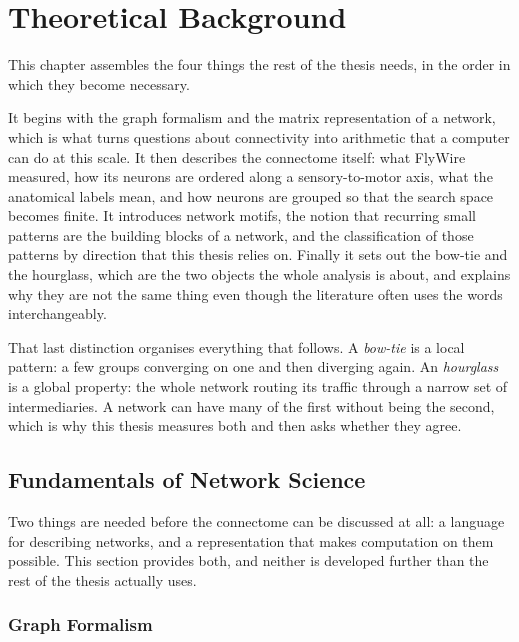 \documentclass[12pt,a4paper,oneside]{article}
\theoremstyle{definition}
\theoremstyle{plain}
\begin{document}
\section{Theoretical Background}
\label{sec:background}

This chapter assembles the four things the rest of the thesis needs, in the
order in which they become necessary.

It begins with the graph formalism and the matrix representation of a
network, which is what turns questions about connectivity into arithmetic
that a computer can do at this scale. It then describes the connectome
itself: what FlyWire measured, how its neurons are ordered along a
sensory-to-motor axis, what the anatomical labels mean, and how neurons are
grouped so that the search space becomes finite. It introduces network
motifs, the notion that recurring small patterns are the building blocks of
a network, and the classification of those patterns by direction that this
thesis relies on. Finally it sets out the bow-tie and the hourglass, which
are the two objects the whole analysis is about, and explains why they are
not the same thing even though the literature often uses the words
interchangeably.

That last distinction organises everything that follows. A \emph{bow-tie} is
a local pattern: a few groups converging on one and then diverging again. An
\emph{hourglass} is a global property: the whole network routing its traffic
through a narrow set of intermediaries. A network can have many of the first
without being the second, which is why this thesis measures both and then
asks whether they agree.

\subsection{Fundamentals of Network Science}
\label{sec:network-science}


Two things are needed before the connectome can be discussed at all: a
language for describing networks, and a representation that makes
computation on them possible. This section provides both, and neither is
developed further than the rest of the thesis actually uses.

\subsubsection{Graph Formalism}
\end{document}
